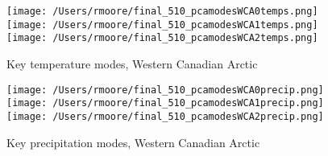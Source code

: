 \documentclass[11pt, oneside]{article}
\begin{document}
\begin{figure}[!htb]
    \centering
      \texttt{[image: /Users/rmoore/final\_510\_pcamodesWCA0temps.png]}
    \endminipage 
    \\
      \texttt{[image: /Users/rmoore/final\_510\_pcamodesWCA1temps.png]}
    \endminipage
    \\
      \texttt{[image: /Users/rmoore/final\_510\_pcamodesWCA2temps.png]}
    \endminipage
    \caption{Key temperature modes, Western Canadian Arctic}\label{pca_temp_WCA}
    \end{figure}

    \begin{figure}[!htb]
        \centering
          \texttt{[image: /Users/rmoore/final\_510\_pcamodesWCA0precip.png]}
        \endminipage 
        \\
          \texttt{[image: /Users/rmoore/final\_510\_pcamodesWCA1precip.png]}
        \endminipage
        \\
          \texttt{[image: /Users/rmoore/final\_510\_pcamodesWCA2precip.png]}
        \endminipage
        \caption{Key precipitation modes, Western Canadian Arctic}\label{pca_precip_WCA}
        \end{figure}
\end{document}
